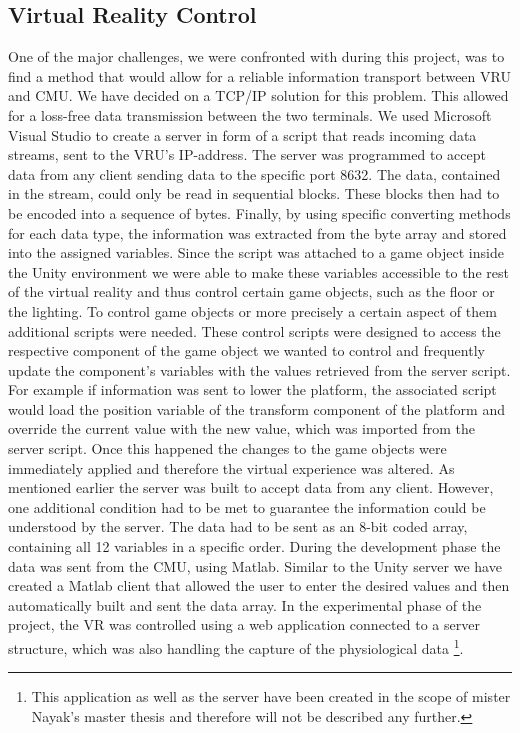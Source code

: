 \subsection{Virtual Reality Control}\label{VRControl}
One of the major challenges, we were confronted with during this project, was to find a method that would allow for a reliable information transport between VRU and CMU. We have decided on a TCP/IP solution for this problem. This allowed for a loss-free data transmission between the two terminals. 
We used Microsoft Visual Studio to create a server in form of a script that reads incoming data streams, sent to the VRU's IP-address. The server was programmed to accept data from any client sending data to the specific port 8632. The data, contained in the stream, could only be read in sequential blocks. These blocks then had to be encoded into a sequence of bytes. Finally, by using specific converting methods for each data type, the information was extracted from the byte array and stored into the assigned variables. Since the script was attached to a game object inside the Unity environment we were able to make these variables accessible to the rest of the virtual reality and thus control certain game objects, such as the floor or the lighting. To control game objects or more precisely a certain aspect of them additional scripts were needed. These control scripts were designed to access the respective component of the game object we wanted to control and frequently update the component's variables with the values retrieved from the server script. For example if information was sent to lower the platform, the associated script would load the position variable of the transform component of the platform and override the current value with the new value, which was imported from the server script. Once this happened the changes to the game objects were immediately applied and therefore the virtual experience was altered.
As mentioned earlier the server was built to accept data from any client. However, one additional condition had to be met to guarantee the information could be understood by the server. The data had to be sent as an 8-bit coded array, containing all 12 variables in a specific order. During the development phase the data was sent from the CMU, using Matlab. Similar to the Unity server we have created a Matlab client that allowed the user to enter the desired values and then automatically built and sent the data array. In the experimental phase of the project, the VR was controlled using a web application connected to a server structure, which was also handling the capture of the physiological data \footnote{This application as well as the server have been created in the scope of mister Nayak's master thesis and therefore will not be described any further.}. 

